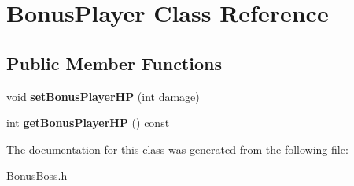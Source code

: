\hypertarget{class_bonus_player}{\section{Bonus\+Player Class Reference}
\label{class_bonus_player}
}
\subsection*{Public Member Functions}
\begin{DoxyCompactItemize}
\item 
\hypertarget{class_bonus_player_a7243fc1584f32f05c4b39f896816e5e3}{void {\bfseries set\+Bonus\+Player\+H\+P} (int damage)}\label{class_bonus_player_a7243fc1584f32f05c4b39f896816e5e3}

\item 
\hypertarget{class_bonus_player_aa4dd3d06dac86aa80b899b15e1545736}{int {\bfseries get\+Bonus\+Player\+H\+P} () const }\label{class_bonus_player_aa4dd3d06dac86aa80b899b15e1545736}

\end{DoxyCompactItemize}


The documentation for this class was generated from the following file\+:\begin{DoxyCompactItemize}
\item 
Bonus\+Boss.\+h\end{DoxyCompactItemize}
